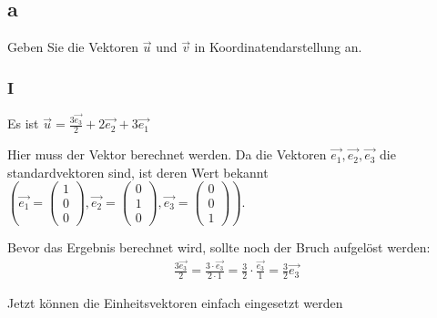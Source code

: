 \subsection{a}
Geben Sie die Vektoren $\vec{u}$ und $\vec{v}$ in Koordinatendarstellung an.

\subsubsection{I}
Es ist $\vec{u} = \frac{3\vec{e_3}}{2} + 2\vec{e_2} + 3\vec{e_1}$

Hier muss der Vektor berechnet werden. Da die Vektoren $\vec{e_1}, \vec{e_2}, \vec{e_3}$ die standardvektoren sind,
ist deren Wert bekannt $\left(\vec{e_1} = \begin{pmatrix}
    1 \\ 0 \\ 0
\end{pmatrix}, \vec{e_2} = \begin{pmatrix}
    0 \\ 1 \\ 0
\end{pmatrix}, \vec{e_3} = \begin{pmatrix}
    0 \\ 0 \\ 1
\end{pmatrix}\right)$. 

Bevor das Ergebnis berechnet wird, sollte noch der Bruch aufgelöst werden: 
\begin{align*}
    \frac{3\vec{e_3}}{2} = \frac{3 \cdot \vec{e_3}}{2 \cdot 1} = \frac{3}{2} \cdot \frac{\vec{e_3}}{1} = \frac{3}{2}\vec{e_3}
\end{align*}

Jetzt können die Einheitsvektoren einfach eingesetzt werden


